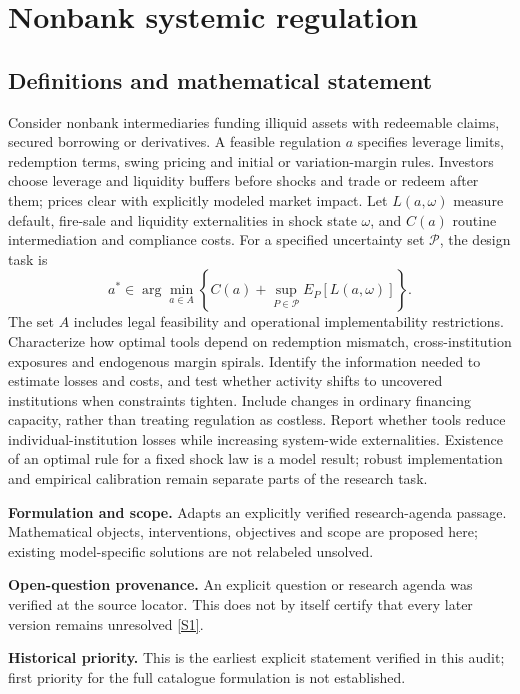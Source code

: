 \documentclass[11pt]{article}
\newcommand{\sref}[2]{\hyperlink{source:#1:#2}{[S#2]}}
\begin{document}
\section*{Nonbank systemic regulation}\label{30007607}
\subsection{Definitions and mathematical statement}
Consider nonbank intermediaries funding illiquid assets with redeemable claims, secured borrowing or derivatives. A feasible regulation \(a\) specifies leverage limits, redemption terms, swing pricing and initial or variation-margin rules. Investors choose leverage and liquidity buffers before shocks and trade or redeem after them; prices clear with explicitly modeled market impact. Let \(L(a,\omega)\) measure default, fire-sale and liquidity externalities in shock state \(\omega\), and \(C(a)\) routine intermediation and compliance costs. For a specified uncertainty set \(\mathcal P\), the design task is
\[a^*\in\arg\min_{a\in A}\left\{C(a)+\sup_{P\in\mathcal P}E_P[L(a,\omega)]\right\}.\]
The set \(A\) includes legal feasibility and operational implementability restrictions. Characterize how optimal tools depend on redemption mismatch, cross-institution exposures and endogenous margin spirals. Identify the information needed to estimate losses and costs, and test whether activity shifts to uncovered institutions when constraints tighten. Include changes in ordinary financing capacity, rather than treating regulation as costless. Report whether tools reduce individual-institution losses while increasing system-wide externalities. Existence of an optimal rule for a fixed shock law is a model result; robust implementation and empirical calibration remain separate parts of the research task.

\par\textbf{Formulation and scope.} Adapts an explicitly verified research-agenda passage. Mathematical objects, interventions, objectives and scope are proposed here; existing model-specific solutions are not relabeled unsolved.

\par\textbf{Open-question provenance.} An explicit question or research agenda was verified at the source locator. This does not by itself certify that every later version remains unresolved \sref{30007607}{1}.

\par\textbf{Historical priority.} This is the earliest explicit statement verified in this audit; first priority for the full catalogue formulation is not established.
\end{document}
